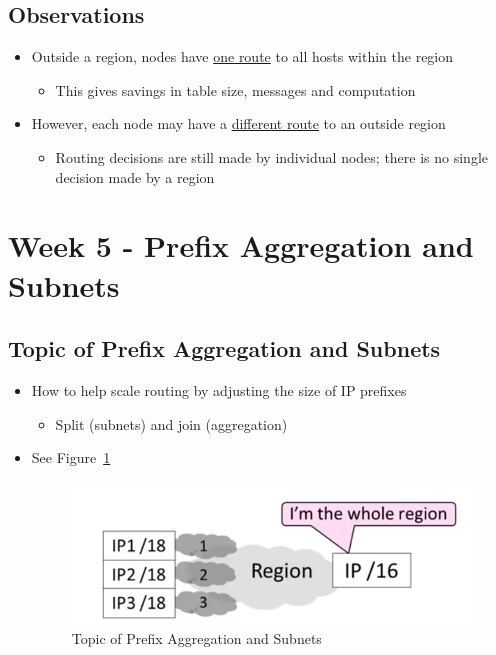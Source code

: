 \documentclass[12pt]{ctexart}   %
\begin{document}
	\subsection{Observations}
	\begin{itemize}
		\item Outside a region, nodes have \underline{one route} to all hosts within the region
		\begin{itemize}
			\item This gives savings in table size, messages and computation
		\end{itemize}
		
		\item However, each node may have a \underline{different route} to an outside region
		\begin{itemize}
			\item Routing decisions are still made by individual nodes; there is no single decision made by a region
		\end{itemize}
	\end{itemize}
	
\section{Week 5 - Prefix Aggregation and Subnets}
	\subsection{Topic of Prefix Aggregation and Subnets}
	\begin{itemize}
		\item How to help scale routing by adjusting the size of IP prefixes
		\begin{itemize}
			\item Split (subnets) and join (aggregation)
		\end{itemize}
		 \item See Figure~\ref{fig:5-10-1}
			
		\begin{figure}[h!] %
		\centering
		 \includegraphics[scale=0.7]{images/5-10-1}
		\caption{ Topic of Prefix Aggregation and Subnets }
		 \label{fig:5-10-1}
		 \end{figure}
	\end{itemize}
	
\end{document}
